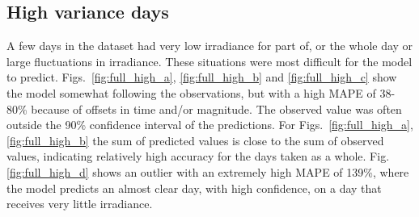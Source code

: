 \subsection{High variance days}
A few days in the dataset had very low irradiance for part of, or the whole day or large fluctuations in irradiance. These situations were most difficult for the model to predict. Figs.~\ref{fig:full_high_a}, \ref{fig:full_high_b} and \ref{fig:full_high_c} show the model somewhat following the observations, but with a high MAPE of 38-80\% because of offsets in time and/or magnitude. The observed value was often outside the 90\% confidence interval of the predictions. For Figs.~\ref{fig:full_high_a}, \ref{fig:full_high_b} the sum of predicted values is close to the sum of observed values, indicating relatively high accuracy for the days taken as a whole. Fig.\ref{fig:full_high_d} shows an outlier with an extremely high MAPE of 139\%, where the model predicts an almost clear day, with high confidence, on a day that receives very little irradiance.

